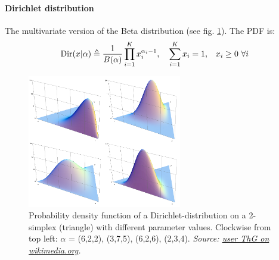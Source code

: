 \documentclass[../main.tex]{subfiles}
\begin{document}
        \paragraph{Dirichlet distribution}  The multivariate version of the Beta distribution (see fig. \ref{Dirichlet_distr}). The PDF is: $$\text{Dir}({x}|{\alpha}) \triangleq \dfrac{1}{B({\alpha})}\prod\limits_{i=1}^K x_i^{\alpha_i-1} \text{,\hspace{1em}} \sum_{i=1}^K x_i =1 \text{,\hspace{1em}} x_i \geq 0 \text{ }\forall i$$
                \begin{figure}[h]
                    \centering
                    \includegraphics[width=0.6\textwidth]{../figures/Dirichlet_distributions.png}
                    \caption{Probability density function of a Dirichlet-distribution on a 2-simplex (triangle) with different parameter values. Clockwise from top left: $\alpha$ = (6,2,2), (3,7,5), (6,2,6), (2,3,4). \textit{Source: \href{https://commons.wikimedia.org/wiki/File:Dirichlet_distributions.png}{user ThG on wikimedia.org}.}}
                    \label{Dirichlet_distr}
                \end{figure}
\end{document}
